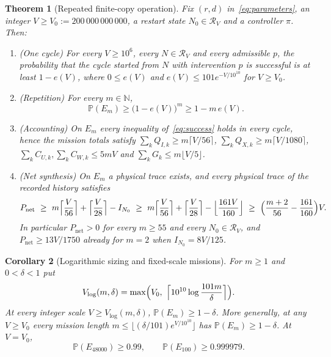 \documentclass[11pt,a4paper]{article}
\theoremstyle{plain}
\newtheorem{theorem}{Theorem}[section]
\newtheorem{corollary}[theorem]{Corollary}
\theoremstyle{definition}
\theoremstyle{remark}
\newcommand{\N}{\mathbb N}
\newcommand{\Prob}{\mathbb P}
\newcommand{\cR}{\mathcal R}
\newcommand{\Iv}{I}
\newcommand{\Pnet}{P_{\mathrm{net}}}
\begin{document}
\begin{theorem}[Repeated finite-copy operation]\label{thm:main}
Fix $(r,d)$ in~\eqref{eq:parameters}, an integer $V\ge V_0:=200\,000\,000\,000$, a restart state $N_0\in\cR_V$ and a controller $\pi$. Then:
\begin{enumerate}[label=(\alph*)]
\item\label{it:one} (One cycle) For every $V\ge10^6$, every $N\in\cR_V$ and every admissible $p$, the probability that the cycle started from $N$ with intervention $p$ is successful is at least $1-e(V)$, where $0\le e(V)$ and $e(V)\le101e^{-V/10^{10}}$ for $V\ge V_0$.
\item\label{it:product} (Repetition) For every $m\in\N$,
\begin{equation}\label{eq:probability}
\Prob(E_m)\ge\bigl(1-e(V)\bigr)^m\ge1-m\,e(V).
\end{equation}
\item\label{it:totals} (Accounting) On $E_m$ every inequality of~\eqref{eq:success} holds in every cycle, hence the mission totals satisfy $\sum_kQ_{I,k}\ge m\lceil V/56\rceil$, $\sum_kQ_{X,k}\ge m\lceil V/1080\rceil$, $\sum_kC_{U,k},\sum_kC_{W,k}\le5mV$ and $\sum_kG_k\le m\lfloor V/5\rfloor$.
\item\label{it:synthesis} (Net synthesis) On $E_m$ a physical trace exists, and every physical trace of the recorded history satisfies
\begin{equation}\label{eq:sharp}
\Pnet\ \ge\ m\Bigl\lceil\frac V{56}\Bigr\rceil+\Bigl\lceil\frac V{28}\Bigr\rceil-\Iv_{N_0}
\ \ge\ m\Bigl\lceil\frac V{56}\Bigr\rceil+\Bigl\lceil\frac V{28}\Bigr\rceil-\Bigl\lfloor\frac{161V}{160}\Bigr\rfloor
\ \ge\ \Bigl(\frac{m+2}{56}-\frac{161}{160}\Bigr)V.
\end{equation}
In particular $\Pnet>0$ for every $m\ge55$ and every $N_0\in\cR_V$, and $\Pnet\ge13V/1750$ already for $m=2$ when $\Iv_{N_0}=8V/125$.
\end{enumerate}
\end{theorem}

\begin{corollary}[Logarithmic sizing and fixed-scale missions]\label{cor:scale}
For $m\ge1$ and $0<\delta<1$ put
\begin{equation}\label{eq:vlog}
V_{\log}(m,\delta)=\max\Bigl(V_0,\ \Bigl\lceil10^{10}\log\frac{101m}{\delta}\Bigr\rceil\Bigr).
\end{equation}
At every integer scale $V\ge V_{\log}(m,\delta)$, $\Prob(E_m)\ge1-\delta$. More generally, at any $V\ge V_0$ every mission length $m\le\lfloor(\delta/101)e^{V/10^{10}}\rfloor$ has $\Prob(E_m)\ge1-\delta$. At $V=V_0$,
\[
\Prob(E_{48000})\ge0.99,\qquad \Prob(E_{100})\ge0.999979.
\]
\end{corollary}
\end{document}
